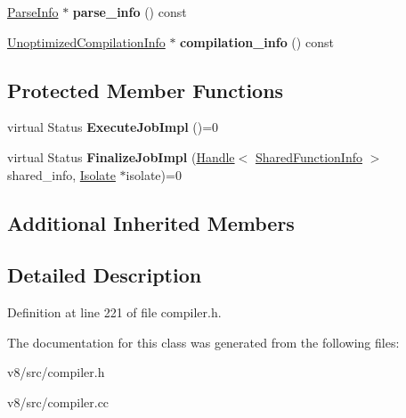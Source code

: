 \begin{DoxyCompactItemize}
\item 
\mbox{\label{classv8_1_1internal_1_1UnoptimizedCompilationJob_a4a66ac4ad7b1408770398402f1a9d987}} 
\mbox{\hyperlink{classv8_1_1internal_1_1ParseInfo}{Parse\+Info}} $\ast$ {\bfseries parse\+\_\+info} () const
\item 
\mbox{\label{classv8_1_1internal_1_1UnoptimizedCompilationJob_a382ff911966bb75725935cfa2e8e6454}} 
\mbox{\hyperlink{classv8_1_1internal_1_1UnoptimizedCompilationInfo}{Unoptimized\+Compilation\+Info}} $\ast$ {\bfseries compilation\+\_\+info} () const
\end{DoxyCompactItemize}
\subsection*{Protected Member Functions}
\begin{DoxyCompactItemize}
\item 
\mbox{\label{classv8_1_1internal_1_1UnoptimizedCompilationJob_a6501f0941b33a3e01657704da0bcf47a}} 
virtual Status {\bfseries Execute\+Job\+Impl} ()=0
\item 
\mbox{\label{classv8_1_1internal_1_1UnoptimizedCompilationJob_aba3bd0490844992a1dff02b36c2bb249}} 
virtual Status {\bfseries Finalize\+Job\+Impl} (\mbox{\hyperlink{classv8_1_1internal_1_1Handle}{Handle}}$<$ \mbox{\hyperlink{classv8_1_1internal_1_1SharedFunctionInfo}{Shared\+Function\+Info}} $>$ shared\+\_\+info, \mbox{\hyperlink{classv8_1_1internal_1_1Isolate}{Isolate}} $\ast$isolate)=0
\end{DoxyCompactItemize}
\subsection*{Additional Inherited Members}


\subsection{Detailed Description}


Definition at line 221 of file compiler.\+h.



The documentation for this class was generated from the following files\+:\begin{DoxyCompactItemize}
\item 
v8/src/compiler.\+h\item 
v8/src/compiler.\+cc\end{DoxyCompactItemize}
